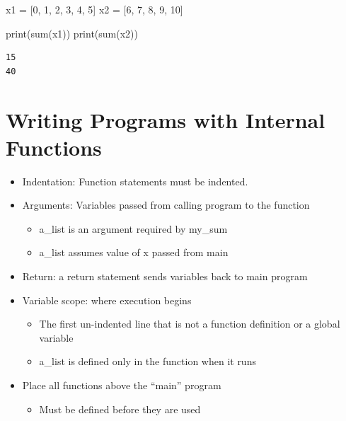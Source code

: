 \documentclass[
  letterpaper,
  DIV=11,
  numbers=noendperiod]{scrreprt}
\newenvironment{Shaded}{\begin{snugshade}}{\end{snugshade}}
\newcommand{\BuiltInTok}[1]{\textcolor[rgb]{0.00,0.23,0.31}{#1}}
\newcommand{\DecValTok}[1]{\textcolor[rgb]{0.68,0.00,0.00}{#1}}
\newcommand{\NormalTok}[1]{\textcolor[rgb]{0.00,0.23,0.31}{#1}}
\newcommand{\OperatorTok}[1]{\textcolor[rgb]{0.37,0.37,0.37}{#1}}
\providecommand{\tightlist}{%
  \setlength{\itemsep}{0pt}\setlength{\parskip}{0pt}}\usepackage{longtable,booktabs,array}
\begin{document}
\begin{Shaded}
\begin{Highlighting}[]
\NormalTok{x1 }\OperatorTok{=}\NormalTok{ [}\DecValTok{0}\NormalTok{, }\DecValTok{1}\NormalTok{, }\DecValTok{2}\NormalTok{, }\DecValTok{3}\NormalTok{, }\DecValTok{4}\NormalTok{, }\DecValTok{5}\NormalTok{]}
\NormalTok{x2 }\OperatorTok{=}\NormalTok{ [}\DecValTok{6}\NormalTok{, }\DecValTok{7}\NormalTok{, }\DecValTok{8}\NormalTok{, }\DecValTok{9}\NormalTok{, }\DecValTok{10}\NormalTok{]}

\BuiltInTok{print}\NormalTok{(}\BuiltInTok{sum}\NormalTok{(x1))}
\BuiltInTok{print}\NormalTok{(}\BuiltInTok{sum}\NormalTok{(x2))}
\end{Highlighting}
\end{Shaded}

\begin{verbatim}
15
40
\end{verbatim}


\chapter{Writing Programs with Internal
Functions}\label{writing-programs-with-internal-functions}

\begin{itemize}
\tightlist
\item
  Indentation: Function statements must be indented.
\item
  Arguments: Variables passed from calling program to the function

  \begin{itemize}
  \tightlist
  \item
    a\_list is an argument required by my\_sum\\
  \item
    a\_list assumes value of x passed from main
  \end{itemize}
\item
  Return: a return statement sends variables back to main program\\
\item
  Variable scope: where execution begins

  \begin{itemize}
  \tightlist
  \item
    The first un-indented line that is not a function definition or a
    global variable
  \item
    a\_list is defined only in the function when it runs
  \end{itemize}
\item
  Place all functions above the ``main'' program

  \begin{itemize}
  \tightlist
  \item
    Must be defined before they are used
  \end{itemize}
\end{itemize}
\end{document}
